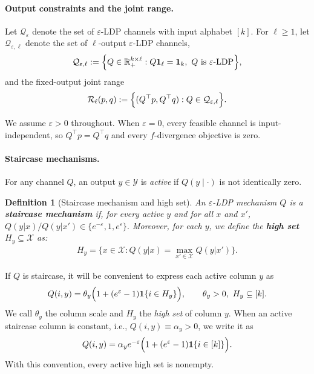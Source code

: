 \documentclass{article}
\theoremstyle{plain}
\newtheorem{definition}[theorem]{Definition}
\theoremstyle{definition}
\theoremstyle{plain}
\newcommand{\eps}{\varepsilon}
\newcommand{\X}{\mathcal{X}}
\newcommand{\Y}{\mathcal{Y}}
\begin{document}
\paragraph{Output constraints and the joint range.}
Let $\mathcal Q_\eps$ denote the set of $\eps$-LDP channels with input alphabet $[k]$. For $\ell\ge 1$, let $\mathcal Q_{\eps,\ell}$ denote the set of $\ell$-output $\eps$-LDP channels,
\begin{align}
    \mathcal Q_{\eps,\ell}
    :=
    \Bigl\{
    Q\in\mathbb R_+^{k\times \ell}:
    Q\mathbf{1}_\ell=\mathbf{1}_k,\ Q \text{ is }\eps\text{-LDP}
    \Bigr\},
\end{align}
and the fixed-output joint range
\begin{align}
    \mathcal R_\ell(p,q)
    :=
    \Bigl\{
    (Q^\top p,Q^\top q): Q\in\mathcal Q_{\eps,\ell}
    \Bigr\}.
\end{align}

We assume $\varepsilon>0$ throughout. When $\varepsilon=0$, every feasible channel is input-independent, so $Q^\top p=Q^\top q$ and every $f$-divergence objective is zero.

\paragraph{Staircase mechanisms.}

For any channel $Q$, an output $y\in\Y$ is \emph{active} if $Q(y\mid\cdot)$ is not identically zero.

\begin{definition}[Staircase mechanism and high set]
    \label{def:staircase}
    An $\eps$-LDP mechanism $Q$ is a \textbf{staircase mechanism} if, for every active $y$ and for all $x$ and $x'$, $Q(y|x)/Q(y|x') \in \{e^{-\eps},1,e^\eps\}.$ Moreover, for each $y$, we define the \textbf{high set} $H_y \subseteq \X$ as:
    \begin{align}
        H_y = \{x \in \X: Q(y|x) = \max_{x' \in \X} Q(y|x') \}.
    \end{align}
\end{definition}

If $Q$ is staircase, it will be convenient to express each active column $y$ as
\begin{align}
    Q(i,y)=\theta_y\Bigl(1+(e^\eps-1)\mathbf{1}\{i\in H_y\}\Bigr),
    \qquad \theta_y>0,\ H_y\subseteq [k].
\end{align}
We call $\theta_y$ the column scale and $H_y$ the \emph{high set} of column $y$. When an active staircase column is constant, i.e., $Q(i,y)\equiv \alpha_y>0$,  we write it as
\begin{align}
    Q(i,y)=\alpha_y e^{-\eps}\Bigl(1+(e^\eps-1)\mathbf{1}\{i\in [k]\}\Bigr).
\end{align}
With this convention, every active high set is nonempty.
\end{document}
